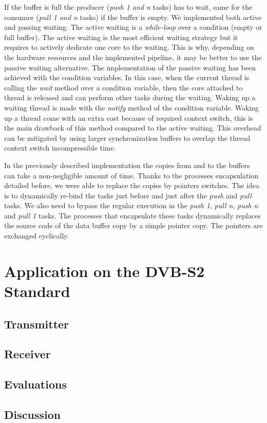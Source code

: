If the buffer is full the producer (\emph{push 1 and n} tasks) has to wait, same
for the consumer (\emph{pull 1 and n} tasks) if the buffer is empty. We
implemented both active and passing waiting. The active waiting is a
\emph{while-loop} over a condition (empty or full buffer). The active waiting is
the most efficient waiting strategy but it requires to actively dedicate one
core to the waiting. This is why, depending on the hardware resources and the
implemented pipeline, it may be better to use the passive waiting alternative.
The implementation of the passive waiting has been achieved with the 
condition variables. In this case, when the current thread is calling the
\emph{wait} method over a condition variable, then the core attached to thread
is released and can perform other tasks during the waiting. Waking up a waiting
thread is made with the \emph{notify} method of the condition variable. Waking
up a thread come with an extra cost because of required context switch, this is
the main drawback of this method compared to the active waiting. This overhead
can be mitigated by using larger synchronization buffers to overlap the thread
context switch incompressible time.

In the previously described implementation the copies from and to the buffers
can take a non-negligible amount of time. Thanks to the processes encapsulation
detailed before, we were able to replace the copies by pointers switches. The
idea is to dynamically re-bind the tasks just before and just after the
\emph{push} and \emph{pull} tasks. We also need to bypass the regular execution
in the \emph{push 1}, \emph{pull n}, \emph{push n} and \emph{pull 1} tasks. The
processes that encapsulate these tasks dynamically replaces the source code of
the data buffer copy by a simple pointer copy. The pointers are exchanged
cyclically.

\section{Application on the DVB-S2 Standard}

\subsection{Transmitter}

\subsection{Receiver}

\subsection{Evaluations}

\subsection{Discussion}
